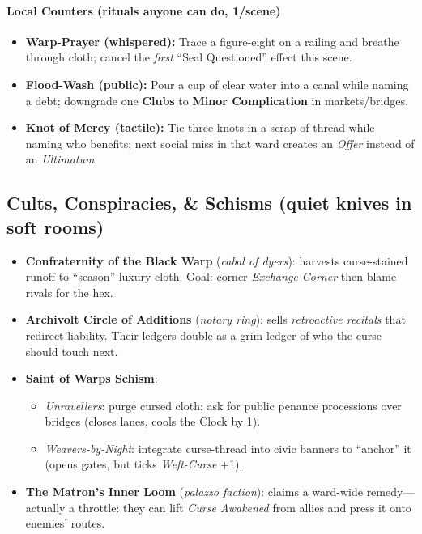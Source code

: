 \paragraph{Local Counters (rituals anyone can do, 1/scene)}
\begin{itemize}
  \item \textbf{Warp-Prayer (whispered):} Trace a figure-eight on a railing and breathe through cloth; cancel the \emph{first} “Seal Questioned” effect this scene.
  \item \textbf{Flood-Wash (public):} Pour a cup of clear water into a canal while naming a debt; downgrade one \textbf{Clubs} to \textbf{Minor Complication} in markets/bridges.
  \item \textbf{Knot of Mercy (tactile):} Tie three knots in a scrap of thread while naming who benefits; next social miss in that ward creates an \emph{Offer} instead of an \emph{Ultimatum}.
\end{itemize}

\subsection*{Cults, Conspiracies, \& Schisms (quiet knives in soft rooms)}
\begin{itemize}
  \item \textbf{Confraternity of the Black Warp} (\emph{cabal of dyers}): harvests curse-stained runoff to “season” luxury cloth. Goal: corner \emph{Exchange Corner} then blame rivals for the hex.
  \item \textbf{Archivolt Circle of Additions} (\emph{notary ring}): sells \emph{retroactive recitals} that redirect liability. Their ledgers double as a grim ledger of who the curse should touch next.
  \item \textbf{Saint of Warps Schism}:
  \begin{itemize}
     \item \emph{Unravellers}: purge cursed cloth; ask for public penance processions over bridges (closes lanes, cools the Clock by 1).
     \item \emph{Weavers-by-Night}: integrate curse-thread into civic banners to “anchor” it (opens gates, but ticks \emph{Weft-Curse} +1).
  \end{itemize}
  \item \textbf{The Matron’s Inner Loom} (\emph{palazzo faction}): claims a ward-wide remedy—actually a throttle: they can lift \emph{Curse Awakened} from allies and press it onto enemies’ routes.
\end{itemize}

